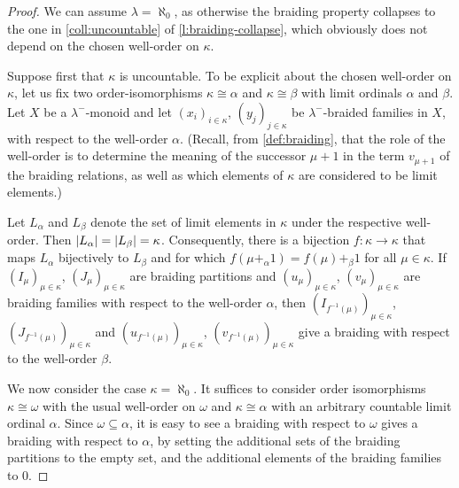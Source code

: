 \documentclass[a4paper,11pt,oneside]{amsart}
\theoremstyle{remark}
\DeclarePairedDelimiter{\card}{\lvert}{\rvert}
\begin{document}
\begin{proof}
  We can assume $\lambda = \aleph_0$, as otherwise the braiding property collapses to the one in \ref{coll:uncountable} of \cref{l:braiding-collapse}, which obviously does not depend on the chosen well-order on $\kappa$.

  Suppose first that $\kappa$ is uncountable.
  To be explicit about the chosen well-order on $\kappa$, let us fix two order-isomorphisms $\kappa \cong \alpha$ and $\kappa\cong \beta$ with limit ordinals $\alpha$ and $\beta$.
  Let $X$ be a $\lambda^-$-monoid and let $(x_i)_{i \in \kappa}$, $(y_j)_{j \in \kappa}$ be $\lambda^-$-braided families in $X$, with respect to the well-order $\alpha$.
  (Recall, from \cref{def:braiding}, that the role of the well-order is to determine the meaning of the successor $\mu+1$ in the term $v_{\mu+1}$ of the braiding relations, as well as which elements of $\kappa$ are considered to be limit elements.)

  Let $L_{\alpha}$ and $L_{\beta}$ denote the set of limit elements in $\kappa$ under the respective well-order.
  Then $\card{L_\alpha} = \card{L_\beta} = \kappa$.
  Consequently, there is a bijection $f \colon \kappa \to \kappa$ that maps $L_\alpha$ bijectively to $L_\beta$ and for which $f(\mu+_\alpha 1) = f(\mu)+_\beta 1$ for all $\mu \in \kappa$.
  If $(I_\mu)_{\mu \in \kappa}$, $(J_\mu)_{\mu \in \kappa}$ are braiding partitions and $(u_\mu)_{\mu \in \kappa}$, $(v_\mu)_{\mu \in \kappa}$ are braiding families with respect to the well-order $\alpha$, then $(I_{f^{-1}(\mu)})_{\mu \in \kappa}$, $(J_{f^{-1}(\mu)})_{\mu \in \kappa}$ and $(u_{f^{-1}(\mu)})_{\mu \in \kappa}$, $(v_{f^{-1}(\mu)})_{\mu \in \kappa}$ give a braiding with respect to the well-order $\beta$.

  We now consider the case $\kappa=\aleph_0$.
  It suffices to consider order isomorphisms $\kappa \cong \omega$ with the usual well-order on $\omega$ and $\kappa \cong \alpha$ with an arbitrary countable limit ordinal $\alpha$.
  Since $\omega \subseteq \alpha$, it is easy to see a braiding with respect to $\omega$ gives a braiding with respect to $\alpha$, by setting the additional sets of the braiding partitions to the empty set, and the additional elements of the braiding families to $0$.


\end{proof}
\end{document}

